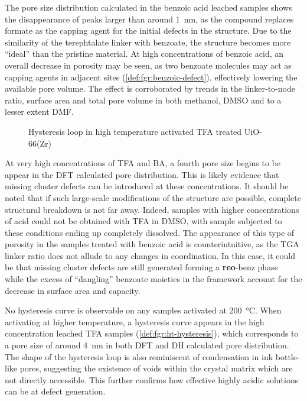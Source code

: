 The pore size distribution calculated in the benzoic acid leached
samples shows the disappearance of peaks larger than around 
\SI{1}{\nano\metre}, as the compound replaces formate as the 
capping agent for the initial defects in the structure. Due to the 
similarity of the terephtalate linker with benzoate, the structure
becomes more ``ideal'' than the pristine material. At high concentrations
of benzoic acid, an overall decrease in porosity may be seen, as 
two benzoate molecules may act as capping agents in adjacent 
sites (\autoref{def:fgr:benzoic-defect}), effectively 
lowering the available pore volume. The effect is corroborated 
by trends in the linker-to-node ratio, surface area and total 
pore volume in both methanol, DMSO and to a lesser extent DMF.

\begin{wrapfigure}[13]{r}{0.3\textwidth}
    \centering
    \captionsetup{format=plain}
    \caption{Hysteresis loop in high temperature activated TFA treated 
    UiO-66(Zr)}%
    \label{def:fgr:ht-hysteresis}
\end{wrapfigure}

At very high concentrations of TFA and BA, a fourth pore size
begins to be appear in the DFT calculated pore distribution.
This is likely evidence that missing cluster defects can be 
introduced at these concentrations. It should be noted that 
if such large-scale modifications of the structure are possible,
complete structural breakdown is not far away. Indeed, samples with 
higher concentrations of acid could not be obtained with TFA in DMSO,
with sample subjected to these conditions ending up completely
dissolved. The appearance of this type of porosity in the samples
treated with benzoic acid is counterintuitive, as the TGA linker
ratio does not allude to any changes in coordination. In this case,
it could be that missing cluster defects are still generated
forming a \textbf{reo}-benz phase~\cite{atzoriEffectBenzoicAcid2017} 
while the excess of ``dangling'' benzoate moieties in the framework 
account for the decrease in surface area and capacity.

No hysteresis curve is observable on any samples activated at 
\SI{200}{\degreeCelsius}. When activating at higher temperature,
a hysteresis curve appears in the high concentration leached
TFA samples (\autoref{def:fgr:ht-hysteresis}), which corresponds to
a pore size of around \SI{4}{\nano\metre} in both DFT and DH calculated
pore distribution. The shape of the hysteresis loop is also 
reminiscent of condensation in ink bottle-like pores, suggesting
the existence of voids within the crystal matrix which are 
not directly accessible. This further confirms how effective 
highly acidic solutions can be at defect generation.